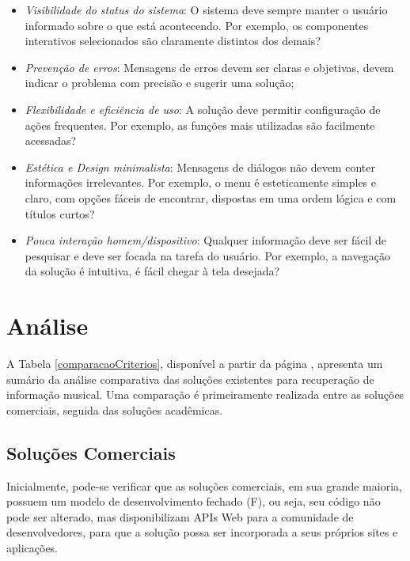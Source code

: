 \begin{itemize}
    \begin{itemize}
        \item \textit{Visibilidade do status do sistema}: O sistema deve sempre manter o usuário informado sobre o que está acontecendo. Por exemplo, os componentes interativos selecionados são claramente distintos dos demais?
        \item \textit{Prevenção de erros}: Mensagens de erros devem ser claras e objetivas, devem indicar o problema com precisão e sugerir uma solução;
        \item \textit{Flexibilidade e eficiência de uso}: A solução deve permitir configuração de ações frequentes. Por exemplo, as funções mais utilizadas são facilmente acessadas?
        \item \textit{Estética e Design minimalista}: Mensagens de diálogos não devem conter informações irrelevantes. Por exemplo, o menu é esteticamente simples e claro, com opções fáceis de encontrar, dispostas em uma ordem lógica e com títulos curtos?
        \item \textit{Pouca interação homem/dispositivo}: Qualquer informação deve ser fácil de pesquisar e deve ser focada na tarefa do usuário. Por exemplo, a navegação da solução é intuitiva, é fácil chegar à tela desejada?
    \end{itemize}
\end{itemize}


\section{Análise} \label{sec:analise}

A Tabela \ref{comparacaoCriterios}, disponível a partir da página \pageref{comparacaoCriterios}, apresenta um sumário da análise comparativa das soluções existentes para recuperação de informação musical. Uma comparação é primeiramente realizada entre as soluções comerciais, seguida das soluções acadêmicas.

\subsection{Soluções Comerciais}

Inicialmente, pode-se verificar que as soluções comerciais, em sua grande maioria, possuem um modelo de desenvolvimento fechado (F), ou seja, seu código não pode ser alterado, mas disponibilizam APIs Web para a comunidade de desenvolvedores, para que a solução possa ser incorporada a seus próprios sites e aplicações.

